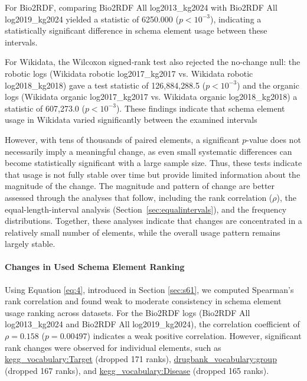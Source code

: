 \documentclass[sw]{iosart2x}
\begin{document}
For Bio2RDF, comparing Bio2RDF All log2013\_kg2024 with Bio2RDF All log2019\_kg2024 yielded a statistic of 6250.000 ($p < 10^{-3}$), indicating a statistically significant difference in schema element usage between these intervals.

For Wikidata, the Wilcoxon signed‐rank test also rejected the no-change null: the robotic logs (Wikidata robotic log2017\_kg2017 vs. Wikidata robotic log2018\_kg2018) gave a test statistic of 126{,}884{,}288.5 ($p < 10^{-3}$) and the organic logs (Wikidata organic log2017\_kg2017 vs. Wikidata organic log2018\_kg2018) a statistic of 607{,}273.0 ($p < 10^{-3}$). These findings indicate that schema element usage in Wikidata varied significantly between the examined
intervals

However, with tens of thousands of paired elements, a significant $p$-value does not necessarily imply a meaningful change, as even small systematic differences can become statistically significant with a large sample size. Thus, these tests indicate that usage is not fully stable over time but provide limited information about the magnitude of the change. The magnitude and pattern of change are better assessed through the analyses that follow, including the rank correlation ($\rho$), the equal-length-interval analysis (Section~\ref{sec:equalintervals}), and the frequency distributions. Together, these analyses indicate that changes are concentrated in a relatively small number of elements, while the overall usage pattern remains largely stable.


\paragraph{\textbf{Changes in Used Schema Element Ranking}}
Using Equation \ref{eq:4}, introduced in Section \ref{sec:s61}, we computed Spearman's rank correlation and found weak to moderate consistency in schema element usage ranking across datasets. For the Bio2RDF logs (Bio2RDF All log2013\_kg2024 and Bio2RDF All log2019\_kg2024), the correlation coefficient of $\rho = 0.158$ ($p = 0.00497$) indicates a weak positive correlation. However, significant rank changes were observed for individual elements, such as \sloppy  %
\href{http://bio2rdf.org/kegg_vocabulary:Target}{kegg\_vocabulary:Target} (dropped 171 ranks), \href{http://bio2rdf.org/drugbank_vocabulary:group}{drugbank\_vocabulary:group} (dropped 167 ranks), and \href{http://bio2rdf.org/kegg_vocabulary:Disease}{kegg\_vocabulary:Disease} (dropped 165 ranks).
\end{document}
